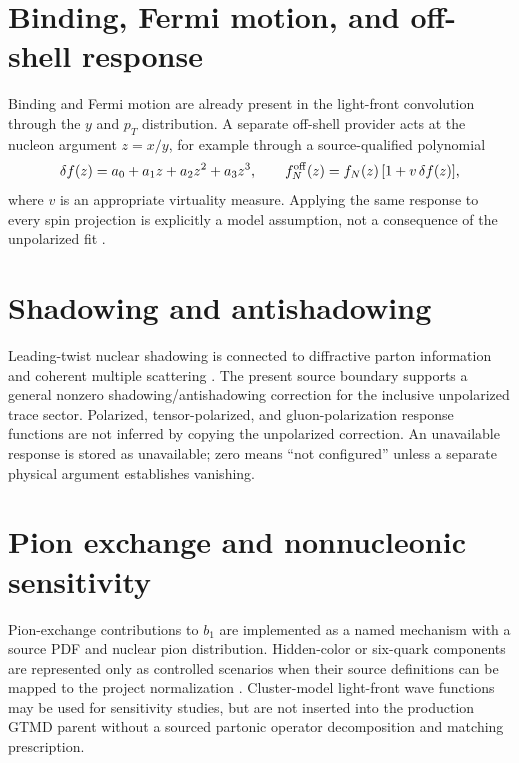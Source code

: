 \documentclass[11pt,oneside]{book}
\begin{document}
\section{Binding, Fermi motion, and off-shell response}

Binding and Fermi motion are already present in the light-front convolution through the $y$ and $p_T$ distribution.  A separate off-shell provider acts at the nucleon argument $z=x/y$, for example through a source-qualified polynomial
\begin{equation}
 \delta f(z)=a_0+a_1z+a_2z^2+a_3z^3,
 \qquad
 f_N^{\rm off}(z)=f_N(z)\,[1+v\,\delta f(z)],
 \label{eq:offshell}
\end{equation}
where $v$ is an appropriate virtuality measure.  Applying the same response to every spin projection is explicitly a model assumption, not a consequence of the unpolarized fit \cite{AccardiEtAl2016CJ15}.

\section{Shadowing and antishadowing}

Leading-twist nuclear shadowing is connected to diffractive parton information and coherent multiple scattering \cite{FrankfurtGuzeyStrikman2012,H1DPDF2006}.  The present source boundary supports a general nonzero shadowing/antishadowing correction for the inclusive unpolarized trace sector.  Polarized, tensor-polarized, and gluon-polarization response functions are not inferred by copying the unpolarized correction.  An unavailable response is stored as unavailable; zero means ``not configured'' unless a separate physical argument establishes vanishing.

\section{Pion exchange and nonnucleonic sensitivity}

Pion-exchange contributions to $b_1$ are implemented as a named mechanism with a source PDF and nuclear pion distribution.  Hidden-color or six-quark components are represented only as controlled scenarios when their source definitions can be mapped to the project normalization \cite{Miller2014b1}.  Cluster-model light-front wave functions may be used for sensitivity studies, but are not inserted into the production GTMD parent without a sourced partonic operator decomposition and matching prescription.
\end{document}
